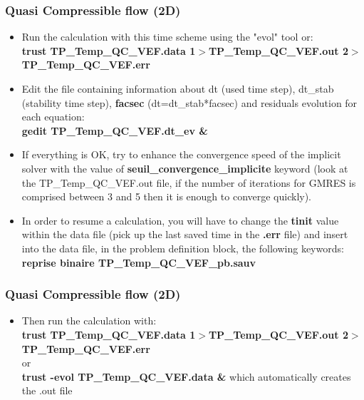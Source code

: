 \documentclass[10pt, hyperref={unicode=true,pdfusetitle, bookmarks=true,bookmarksnumbered=false,bookmarksopen=false, breaklinks=false,pdfborder={0 0l 1},backref=true,colorlinks=true,linkcolor=darkblue,pageanchor}]{beamer}
\begin{document}
\begin{frame}
\frametitle{Quasi Compressible flow (2D)}
\begin{block}{}

\begin{itemize}
\item Run the calculation with this time scheme using the "evol" tool or: \\
{\footnotesize{\textbf{trust TP\_Temp\_QC\_VEF.data 1$>$TP\_Temp\_QC\_VEF.out 2$>$TP\_Temp\_QC\_VEF.err}}}

\item Edit the file containing information about dt (used time step), dt\_stab (stability time step), \textbf{facsec} (dt=dt\_stab*facsec) and residuals evolution for each equation: \\
\textbf{gedit TP\_Temp\_QC\_VEF.dt\_ev \&}

\item  If everything is OK, try to enhance the convergence speed of the implicit solver with the value of \textbf{seuil\_convergence\_implicite} keyword (look at the TP\_Temp\_QC\_VEF.out file, if the number of iterations for GMRES is comprised between 3 and 5 then it is enough to converge quickly).

\item  In order to resume a calculation, you will have to change the \textbf{tinit} value within the data file (pick up the last saved time in the \textbf{.err} file) and insert into the data file, in the problem definition block, the following keywords: \\
\textbf{reprise binaire TP\_Temp\_QC\_VEF\_pb.sauv}
\end{itemize}

\end{block}
\end{frame}
\begin{frame}
\frametitle{Quasi Compressible flow (2D)}
\begin{block}{}

\begin{itemize}

\item  Then run the calculation with: \\
{\footnotesize{\textbf{trust TP\_Temp\_QC\_VEF.data 1$>$TP\_Temp\_QC\_VEF.out 2$>$TP\_Temp\_QC\_VEF.err}}} \\
or \\
\textbf{trust -evol TP\_Temp\_QC\_VEF.data \&} which automatically creates the .out file

\end{itemize}

\end{block}
\end{frame}
\end{document}
